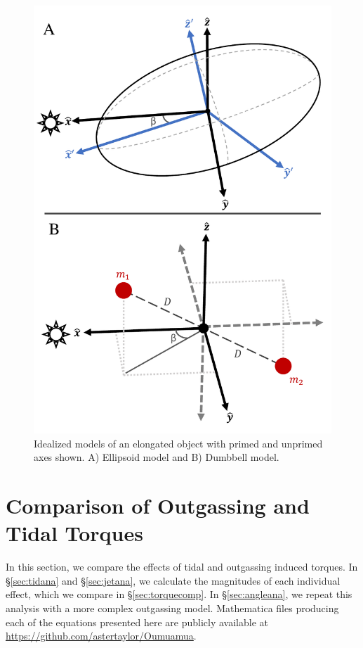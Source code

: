 \documentclass[twocolumn,doublespacing]{aastex631}
\begin{document}
\begin{figure}
\centering
\includegraphics[width=\linewidth,angle=0]{dumbbellmodel.pdf}
\caption{Idealized models of an elongated object with primed and unprimed axes shown. A) Ellipsoid model and B) Dumbbell model.}
\label{fig:object_model}
\end{figure}

\section{Comparison of Outgassing and Tidal Torques}\label{sec:bigana}

In this section, we compare the effects of tidal and outgassing induced torques. In \S\ref{sec:tidana} and \S\ref{sec:jetana}, we calculate the magnitudes of each individual effect, which we compare in \S\ref{sec:torquecomp}. In \S\ref{sec:angleana}, we repeat this analysis with a more complex outgassing model. Mathematica files producing each of the equations presented here are publicly available at \url{https://github.com/astertaylor/Oumuamua}. 
\end{document}
